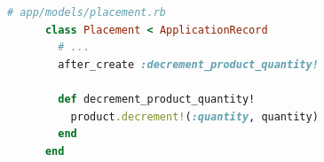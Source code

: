 \documentclass[]{report}
\begin{document}
    \begin{scriptsize}
      \begin{lstlisting}[language=ruby, caption={Implémentation de la mise à jour de la quantité des produits}, label={lst:placement_decrement_product_quantity}]
      # app/models/placement.rb
      class Placement < ApplicationRecord
        # ...
        after_create :decrement_product_quantity!

        def decrement_product_quantity!
          product.decrement!(:quantity, quantity)
        end
      end
      \end{lstlisting}
    \end{scriptsize}
\end{document}
